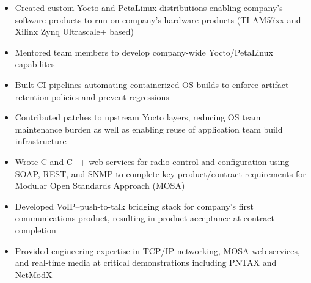 \begin{itemize}
    \item Created custom Yocto and PetaLinux distributions enabling company's software products to run on company's hardware products (TI AM57xx and Xilinx Zynq Ultrascale+ based)
    \item Mentored team members to develop company-wide Yocto/PetaLinux capabilites
    \item Built CI pipelines automating containerized OS builds to enforce artifact retention policies and prevent regressions
    \item Contributed patches to upstream Yocto layers, reducing OS team maintenance burden as well as enabling reuse of application team build infrastructure
    \item Wrote C and C++ web services for radio control and configuration using SOAP, REST, and SNMP to complete key product/contract requirements for Modular Open Standards Approach (MOSA)
    \item Developed VoIP--push-to-talk bridging stack for company's first communications product, resulting in product acceptance at contract completion
    \item Provided engineering expertise in TCP/IP networking, MOSA web services, and real-time media at critical demonstrations including PNTAX and NetModX
\end{itemize}
